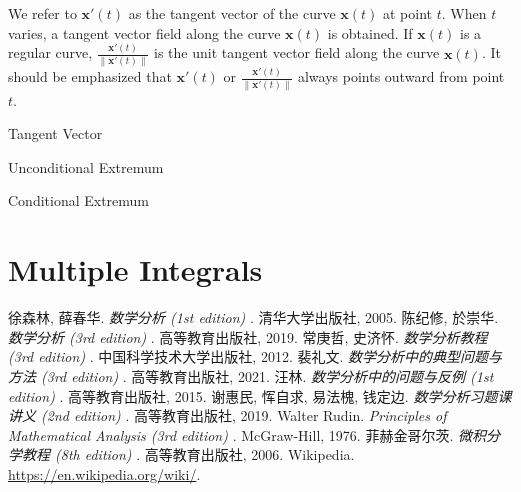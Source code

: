 \documentclass[11pt]{../../TexTemplate/elegantbook}
\begin{document}
We refer to \( \mathbf{x}'(t) \) as the tangent vector of the curve \( \mathbf{x}(t) \) at point \( t \). 
When \( t \) varies, a tangent vector field along the curve \( \mathbf{x}(t) \) is obtained. 
If \( \mathbf{x}(t) \) is a regular curve, 
\( \frac{\mathbf{x}'(t)}{\|\mathbf{x}'(t)\|} \) is the unit tangent vector field along the curve \( \mathbf{x}(t) \). 
It should be emphasized that \( \mathbf{x}'(t) \) or \( \frac{\mathbf{x}'(t)}{\|\mathbf{x}'(t)\|} \) 
always points outward from point \( t \).

\begin{definition}{Tangent Vector}
\end{definition}

\begin{leftbarTitle}{Unconditional Extremum}\end{leftbarTitle}

\begin{leftbarTitle}{Conditional Extremum}\end{leftbarTitle}


\chapter{Multiple Integrals}




\begin{thebibliography}{99} 
 徐森林, 薛春华. \emph{数学分析 (1st edition) }. 清华大学出版社, 2005.
 陈纪修, 於崇华. \emph{数学分析 (3rd edition) }. 高等教育出版社, 2019.
 常庚哲, 史济怀. \emph{数学分析教程 (3rd edition) }. 中国科学技术大学出版社, 2012.
 裴礼文. \emph{数学分析中的典型问题与方法 (3rd edition) }. 高等教育出版社, 2021.
 汪林. \emph{数学分析中的问题与反例 (1st edition) }. 高等教育出版社, 2015.
 谢惠民, 恽自求, 易法槐, 钱定边. \emph{数学分析习题课讲义 (2nd edition) }. 高等教育出版社, 2019.
 Walter Rudin. \emph{Principles of Mathematical Analysis (3rd edition) }. McGraw-Hill, 1976.
 菲赫金哥尔茨. \emph{微积分学教程 (8th edition) }. 高等教育出版社, 2006.
 Wikipedia. \url{https://en.wikipedia.org/wiki/}.
\end{thebibliography}
\end{document}

